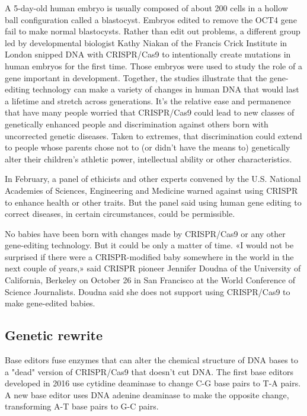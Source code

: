 \documentclass[12pt]{article}
\begin{document}
A 5-day-old human embryo is usually composed of about 200 cells in a hollow ball configuration called a blastocyst. Embryos edited to remove the OCT4 gene fail to make normal blastocysts. Rather than edit out problems, a different group led by developmental biologist Kathy Niakan of the Francis Crick Institute in London snipped DNA with CRISPR/Cas9 to intentionally create mutations in human embryos for the first time. Those embryos were used to study the role of a gene important in development. Together, the studies illustrate that the gene-editing technology can make a variety of changes in human DNA that would last a lifetime and stretch across generations. It’s the relative ease and permanence that have many people worried that CRISPR/Cas9 could lead to new classes of genetically enhanced people and discrimination against others born with uncorrected genetic diseases. Taken to extremes, that discrimination could extend to people whose parents chose not to (or didn't have the means to) genetically alter their children's athletic power, intellectual ability or other characteristics.

In February, a panel of ethicists and other experts convened by the U.S. National Academies of Sciences, Engineering and Medicine warned against using CRISPR to enhance health or other traits. But the panel said using human gene editing to correct diseases, in certain circumstances, could be permissible.

No babies have been born with changes made by CRISPR/Cas9 or any other gene-editing technology. But it could be only a matter of time. «I would not be surprised if there were a CRISPR-modified baby somewhere in the world in the next couple of years,» said CRISPR pioneer Jennifer Doudna of the University of California, Berkeley on October 26 in San Francisco at the World Conference of Science Journalists. Doudna said she does not support using CRISPR/Cas9 to make gene-edited babies.

\subsection{Genetic rewrite}
Base editors fuse enzymes that can alter the chemical structure of DNA bases to a "dead" version of CRISPR/Cas9 that doesn't cut DNA. The first base editors developed in 2016 use cytidine deaminase to change C-G base pairs to T-A pairs. A new base editor uses DNA adenine deaminase to make the opposite change, transforming A-T base pairs to G-C pairs.
\end{document}
